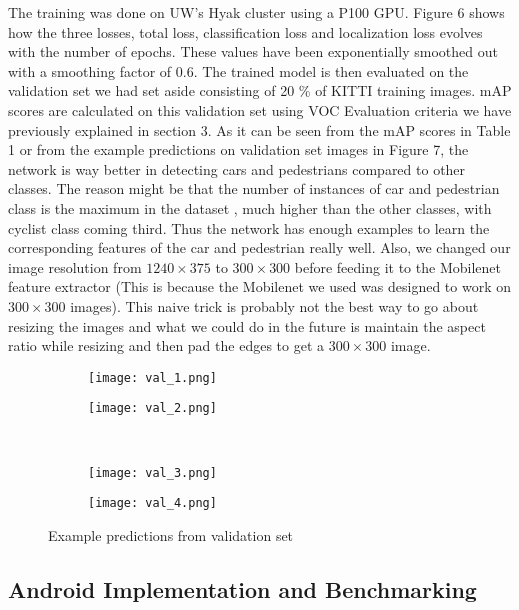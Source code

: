 \documentclass{article}
\begin{document}
The training was done on UW's Hyak cluster using a P100 GPU. Figure 6 shows how the three losses, total loss, classification loss and localization loss evolves with the number of epochs. These values have been exponentially smoothed out with a smoothing factor of 0.6. The trained model is then evaluated on the validation set we had set aside consisting of 20 \% of KITTI training images. mAP scores are calculated on this validation set using VOC Evaluation criteria we have previously explained in section 3.
As it can be seen from the mAP scores in Table 1 or from the example predictions on validation set images in Figure 7, the network is way better in detecting cars and pedestrians compared to other classes. The reason might be that the number of instances of car and pedestrian class is the maximum in the dataset , much higher than the other classes, with cyclist class coming third. Thus the network has enough examples to learn the corresponding features of the car and pedestrian really well. Also, we changed our image resolution from $1240 \times 375$ to $300 \times 300$ before feeding it to the Mobilenet feature extractor (This is because the Mobilenet we used was designed to work on $300 \times 300$ images). This naive trick is probably not the best way to go about resizing the images and what we could do in the future is maintain the aspect ratio while resizing and then pad the edges to get a $300 \times 300$ image.
\begin{figure}
	\centering
	\begin{subfigure}[b]{0.45\textwidth}
		\centering
		\texttt{[image: val\_1.png]}
	\end{subfigure}
	\begin{subfigure}[b]{0.45\textwidth}
		\centering
		\texttt{[image: val\_2.png]}
	\end{subfigure}
	\\
	\begin{subfigure}[b]{0.45\textwidth}
		\centering
		\texttt{[image: val\_3.png]}
	\end{subfigure}
	\begin{subfigure}[b]{0.45\textwidth}
		\centering
		\texttt{[image: val\_4.png]}
	\end{subfigure}
	\caption{Example predictions from validation set}
\end{figure}

\subsection{Android Implementation and Benchmarking}
\end{document}
